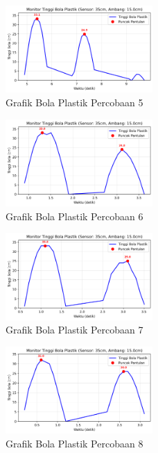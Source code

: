 \begin{figure}[htbp]
    \centering
    \includegraphics[width=0.5\textwidth]{chapters/DataPercobaan/Grafik_Bola_Plastik_5.png}
    \caption{Grafik Bola Plastik Percobaan 5}
\end{figure}
\begin{figure}[htbp]
    \centering
    \includegraphics[width=0.5\textwidth]{chapters/DataPercobaan/Grafik_Bola_Plastik_6.png}
    \caption{Grafik Bola Plastik Percobaan 6}
\end{figure}
\begin{figure}[htbp]
    \centering
    \includegraphics[width=0.5\textwidth]{chapters/DataPercobaan/Grafik_Bola_Plastik_7.png}
    \caption{Grafik Bola Plastik Percobaan 7}
\end{figure}
\begin{figure}[htbp]
    \centering
    \includegraphics[width=0.5\textwidth]{chapters/DataPercobaan/Grafik_Bola_Plastik_8.png}
    \caption{Grafik Bola Plastik Percobaan 8}
\end{figure}
